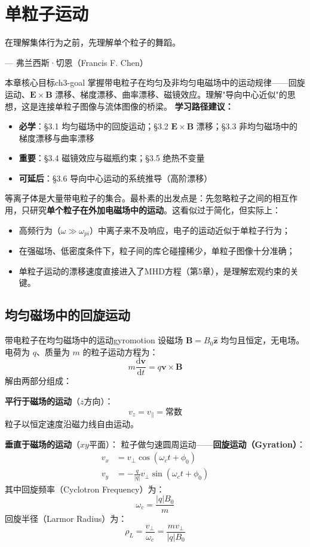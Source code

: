 \documentclass[12pt,a4paper,openany,oneside]{book}
\newcommand{\diff}{\mathrm{d}}
\newcommand{\vect}[1]{\bm{#1}}
\newcommand{\unitvec}[1]{\hat{\vect{#1}}}
\newcommand{\difficulty}[1]{\marginnote{\textcolor{red}{\textbf{[#1]}}}}
\begin{document}
\chapter{单粒子运动}
\epigraph{在理解集体行为之前，先理解单个粒子的舞蹈。}{--- 弗兰西斯·切恩（Francis F. Chen）}

\begin{insight}{本章核心目标}{ch3-goal}
掌握带电粒子在均匀及非均匀电磁场中的运动规律——回旋运动、$\vect{E}\times\vect{B}$ 漂移、梯度漂移、曲率漂移、磁镜效应。理解"导向中心近似"的思想，这是连接单粒子图像与流体图像的桥梁。
\tcblower
\textbf{学习路径建议：}

\begin{itemize}[leftmargin=*]
\item[\textcolor{red}{$\blacksquare$}] \textbf{必学}：\S3.1 均匀磁场中的回旋运动；\S3.2 $\vect{E}\times\vect{B}$ 漂移；\S3.3 非均匀磁场中的梯度漂移与曲率漂移
\item[\textcolor{orange}{$\blacksquare$}] \textbf{重要}：\S3.4 磁镜效应与磁瓶约束；\S3.5 绝热不变量
\item[\textcolor{green}{$\blacksquare$}] \textbf{可延后}：\S3.6 导向中心运动的系统推导（高阶漂移）
\end{itemize}
\end{insight}

等离子体是大量带电粒子的集合。最朴素的出发点是：先忽略粒子之间的相互作用，只研究\textbf{单个粒子在外加电磁场中的运动}。这看似过于简化，但实际上：
\begin{itemize}
\item 高频行为（$\omega \gg \omega_{pi}$）中离子来不及响应，电子的运动近似于单粒子行为；
\item 在强磁场、低密度条件下，粒子间的库仑碰撞稀少，单粒子图像十分准确；
\item 单粒子运动的漂移速度直接进入了MHD方程（第5章），是理解宏观约束的关键。
\end{itemize}

\section{均匀磁场中的回旋运动}\difficulty{基础}

\begin{theorem}{带电粒子在均匀磁场中的运动}{gyromotion}
设磁场 $\vect{B} = B_0\unitvec{z}$ 均匀且恒定，无电场。电荷为 $q$、质量为 $m$ 的粒子运动方程为：
\[
m\frac{\diff\vect{v}}{\diff t} = q\vect{v}\times\vect{B}
\]
解由两部分组成：

\textbf{平行于磁场的运动}（$z$方向）：
\[
v_z = v_{\parallel} = \text{常数}
\]
粒子以恒定速度沿磁力线自由运动。

\textbf{垂直于磁场的运动}（$xy$平面）：
粒子做匀速圆周运动——\textbf{回旋运动（Gyration）}：
\begin{align*}
v_x &= v_\perp \cos(\omega_c t + \phi_0) \\
v_y &= -\frac{q}{|q|} v_\perp \sin(\omega_c t + \phi_0)
\end{align*}
其中回旋频率（Cyclotron Frequency）为：
\[
\omega_c = \frac{|q|B_0}{m}
\]
回旋半径（Larmor Radius）为：
\[
\rho_L = \frac{v_\perp}{\omega_c} = \frac{m v_\perp}{|q|B_0}
\]
\end{theorem}
\end{document}
